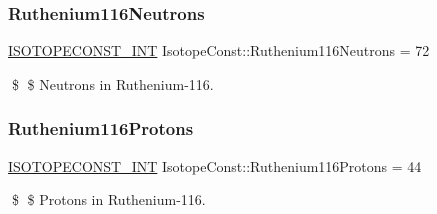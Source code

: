 \subsubsection{\texorpdfstring{Ruthenium116\+Neutrons}{Ruthenium116Neutrons}}
{\footnotesize\ttfamily \mbox{\hyperlink{group___isotope_const-_macros_ga5f18360b3e99483a35c32d789e62621c}{I\+S\+O\+T\+O\+P\+E\+C\+O\+N\+S\+T\+\_\+\+I\+NT}} Isotope\+Const\+::\+Ruthenium116\+Neutrons = 72}

\$ \$ Neutrons in Ruthenium-\/116. \mbox{\label{group___isotope_const-_ruthenium-_ru116_gaa82c8fbe61707b79f6373d5f6547a603}} 
\subsubsection{\texorpdfstring{Ruthenium116\+Protons}{Ruthenium116Protons}}
{\footnotesize\ttfamily \mbox{\hyperlink{group___isotope_const-_macros_ga5f18360b3e99483a35c32d789e62621c}{I\+S\+O\+T\+O\+P\+E\+C\+O\+N\+S\+T\+\_\+\+I\+NT}} Isotope\+Const\+::\+Ruthenium116\+Protons = 44}

\$ \$ Protons in Ruthenium-\/116. 
